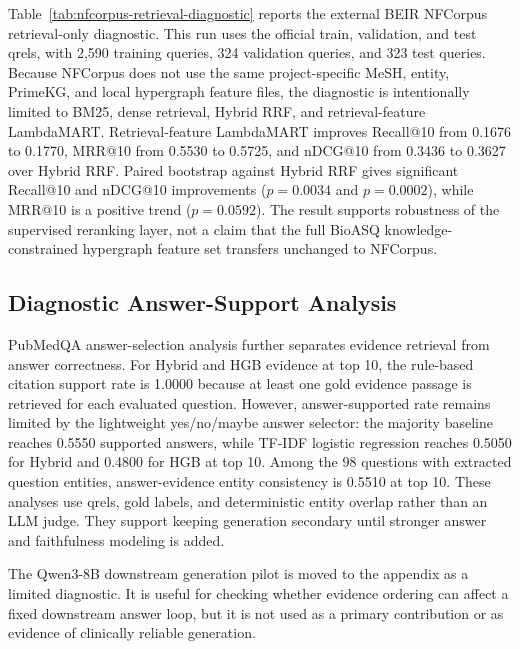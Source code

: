 

Table~\ref{tab:nfcorpus-retrieval-diagnostic} reports the external BEIR NFCorpus retrieval-only diagnostic. This run uses the official train, validation, and test qrels, with 2,590 training queries, 324 validation queries, and 323 test queries. Because NFCorpus does not use the same project-specific MeSH, entity, PrimeKG, and local hypergraph feature files, the diagnostic is intentionally limited to BM25, dense retrieval, Hybrid RRF, and retrieval-feature LambdaMART. Retrieval-feature LambdaMART improves Recall@10 from 0.1676 to 0.1770, MRR@10 from 0.5530 to 0.5725, and nDCG@10 from 0.3436 to 0.3627 over Hybrid RRF. Paired bootstrap against Hybrid RRF gives significant Recall@10 and nDCG@10 improvements ($p=0.0034$ and $p=0.0002$), while MRR@10 is a positive trend ($p=0.0592$). The result supports robustness of the supervised reranking layer, not a claim that the full BioASQ knowledge-constrained hypergraph feature set transfers unchanged to NFCorpus.



\subsection{Diagnostic Answer-Support Analysis}

PubMedQA answer-selection analysis further separates evidence retrieval from answer correctness. For Hybrid and HGB evidence at top 10, the rule-based citation support rate is 1.0000 because at least one gold evidence passage is retrieved for each evaluated question. However, answer-supported rate remains limited by the lightweight yes/no/maybe answer selector: the majority baseline reaches 0.5550 supported answers, while TF-IDF logistic regression reaches 0.5050 for Hybrid and 0.4800 for HGB at top 10. Among the 98 questions with extracted question entities, answer-evidence entity consistency is 0.5510 at top 10. These analyses use qrels, gold labels, and deterministic entity overlap rather than an LLM judge. They support keeping generation secondary until stronger answer and faithfulness modeling is added.

The Qwen3-8B downstream generation pilot is moved to the appendix as a limited diagnostic. It is useful for checking whether evidence ordering can affect a fixed downstream answer loop, but it is not used as a primary contribution or as evidence of clinically reliable generation.
